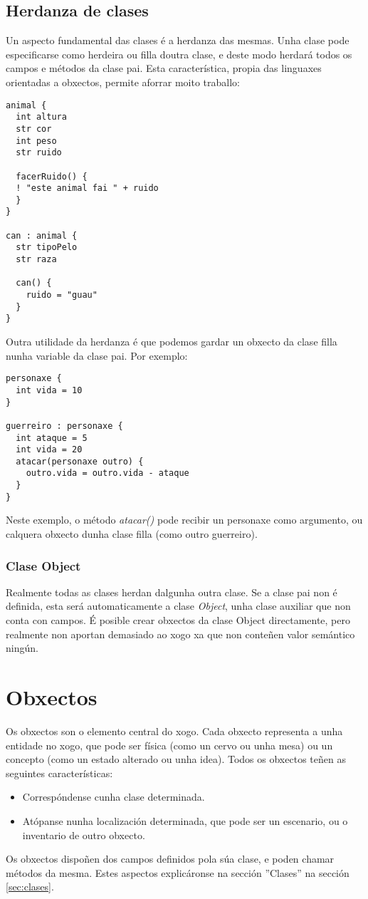 \subsection{Herdanza de clases}
Un aspecto fundamental das clases é a herdanza das mesmas. Unha clase pode
especificarse como herdeira ou filla doutra clase, e deste modo herdará todos os
campos e métodos da clase pai. Esta característica, propia das linguaxes
orientadas a obxectos, permite aforrar moito traballo:
\begin{lstlisting}
animal {
  int altura
  str cor
  int peso
  str ruido
  
  facerRuido() {
  ! "este animal fai " + ruido
  }
}

can : animal {
  str tipoPelo
  str raza
  
  can() {
    ruido = "guau"
  }
}
\end{lstlisting}
\par
Outra utilidade da herdanza é que podemos gardar un obxecto da clase filla nunha
variable da clase pai. Por exemplo:
\begin{lstlisting}
personaxe {
  int vida = 10
}

guerreiro : personaxe {
  int ataque = 5
  int vida = 20
  atacar(personaxe outro) {
    outro.vida = outro.vida - ataque 
  }
}
\end{lstlisting}
\par Neste exemplo, o método {\it atacar()} pode recibir un personaxe como
argumento, ou calquera obxecto dunha clase filla (como outro guerreiro).

\subsubsection{Clase Object}
Realmente todas as clases herdan dalgunha outra clase. Se a clase pai non é
definida, esta será automaticamente a clase {\it Object}, unha clase auxiliar
que non conta con campos. É posible crear obxectos da clase Object
directamente, pero realmente non aportan demasiado ao xogo xa que non conteñen
valor semántico ningún.

\section{Obxectos}
\label{sec:obxectos}
Os obxectos son o elemento central do xogo. Cada obxecto representa a unha
entidade no xogo, que pode ser física (como un cervo ou unha mesa) ou un
concepto (como un estado alterado ou unha idea). Todos os obxectos teñen as
seguintes características:
\begin{itemize}
  \item Correspóndense cunha clase determinada.
  \item Atópanse nunha localización determinada, que pode ser un escenario, ou o
  inventario de outro obxecto.
\end{itemize}
\par
Os obxectos dispoñen dos campos definidos pola súa clase, e poden chamar
métodos da mesma. Estes aspectos explicáronse na sección ''Clases'' na sección
\ref{sec:clases}.

